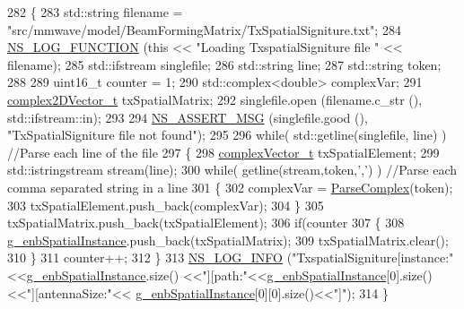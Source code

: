 \begin{DoxyCode}
282 \{
283         std::string filename = \textcolor{stringliteral}{"src/mmwave/model/BeamFormingMatrix/TxSpatialSigniture.txt"};
284         \hyperlink{log-macros-disabled_8h_a90b90d5bad1f39cb1b64923ea94c0761}{NS\_LOG\_FUNCTION} (\textcolor{keyword}{this} << \textcolor{stringliteral}{"Loading TxspatialSigniture file "} << filename);
285         std::ifstream singlefile;
286         std::string line;
287         std::string token;
288 
289         uint16\_t counter = 1;
290         std::complex<double> complexVar;
291         \hyperlink{namespacens3_aa25e3feece2676fd7470d50d4ba3d1d1}{complex2DVector\_t} txSpatialMatrix;
292         singlefile.open (filename.c\_str (), std::ifstream::in);
293 
294         \hyperlink{assert_8h_aff5ece9066c74e681e74999856f08539}{NS\_ASSERT\_MSG} (singlefile.good (), \textcolor{stringliteral}{"TxSpatialSigniture file not found"});
295 
296     \textcolor{keywordflow}{while}( std::getline(singlefile, line) ) \textcolor{comment}{//Parse each line of the file}
297     \{
298         \hyperlink{namespacens3_a6a7f75817ae50e6ac47414955b17d926}{complexVector\_t} txSpatialElement;
299                 std::istringstream stream(line);
300                 \textcolor{keywordflow}{while}( getline(stream,token,\textcolor{charliteral}{','}) ) \textcolor{comment}{//Parse each comma separated string in a line}
301                 \{
302                         complexVar = \hyperlink{classns3_1_1MmWaveBeamforming_ac14df8250989c3400d482f974bf4104b}{ParseComplex}(token);
303                         txSpatialElement.push\_back(complexVar);
304                 \}
305                 txSpatialMatrix.push\_back(txSpatialElement);
306                 \textcolor{keywordflow}{if}(counter %
307                 \{
308                         \hyperlink{namespacens3_afc45dc6f6bc8f2231642ae6ed70787c1}{g\_enbSpatialInstance}.push\_back(txSpatialMatrix);
309                         txSpatialMatrix.clear();
310                 \}
311             counter++;
312     \}
313     \hyperlink{group__logging_gafbd73ee2cf9f26b319f49086d8e860fb}{NS\_LOG\_INFO} (\textcolor{stringliteral}{"TxspatialSigniture[instance:"}<<\hyperlink{namespacens3_afc45dc6f6bc8f2231642ae6ed70787c1}{g\_enbSpatialInstance}.size()
      <<\textcolor{stringliteral}{"][path:"}<<\hyperlink{namespacens3_afc45dc6f6bc8f2231642ae6ed70787c1}{g\_enbSpatialInstance}[0].size()<<\textcolor{stringliteral}{"][antennaSize:"}<<
      \hyperlink{namespacens3_afc45dc6f6bc8f2231642ae6ed70787c1}{g\_enbSpatialInstance}[0][0].size()<<\textcolor{stringliteral}{"]"});
314 \}
\end{DoxyCode}


